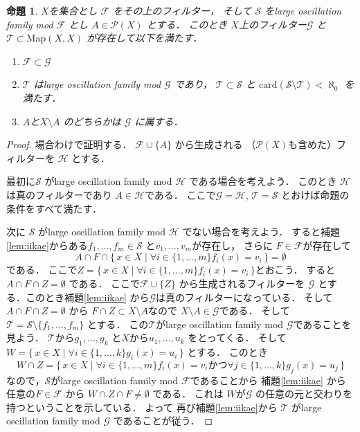 \documentclass[leqno, a4paper, 12pt]{jsarticle}
\newtheorem{prop}[thm]{命題}
\newcommand{\card}{\mathrm{card}}
\newcommand{\myfil}[1]{\mathcal{#1}}
\newcommand{\myfam}[1]{\mathscr{#1}}
\newcommand{\mymap}[2]{\mathrm{Map}(#1, #2)}
\newcommand{\mypowset}[1]{\mathcal{P}(#1)}
\begin{document}
\begin{prop}\label{prop:sagesage}
$X$を集合とし
$\myfil{F}$
をその上のフィルター，
そして
$\myfam{S}$
をlarge oscillation family mod $\myfil{F}$
とし
$A\in \mypowset{X}$
とする．
このとき
$X$上のフィルター$\myfil{G}$
と
$\myfam{T}\subset \mymap{X}{X}$
が存在して以下を満たす．
\begin{enumerate}[label=\textup{(\arabic*)}]
\item 
$\myfil{F}\subset \myfil{G}$
\item 
$\myfam{T}$
はlarge oscillation family mod $\myfam{G}$
であり，
$\myfam{T}\subset \myfam{S}$
と
$\card(\myfam{S}\setminus \myfam{T})<\aleph_{0}$
を満たす．
\item 
$A$と$X\setminus A$
のどちらかは
$\myfil{G}$
に属する．
\end{enumerate}
\end{prop}
\begin{proof}
場合わけで証明する．
$\myfil{F}\cup \{A\}$
から生成される
（$\mypowset{X}$も含めた）フィルターを
$\myfil{H}$
とする．

最初に$\myfam{S}$
がlarge oscillation family mod $\myfil{H}$
である場合を考えよう．
このとき
$\myfil{H}$は真のフィルターであり
$A\in \myfil{H}$である．
ここで$\myfil{G}=\myfil{H}$, 
$\myfam{T}=\myfam{S}$
とおけば命題の条件をすべて満たす．

次に
$\myfam{S}$
がlarge oscillation family mod $\myfil{H}$
でない場合を考えよう．
すると補題\ref{lem:iikae}からある$f_{1}, \dots, f_{m}\in \myfam{S}$
と$v_{1}, \dots, v_{m}$が存在し，
さらに
$F\in \myfil{F}$が存在して
\[
A\cap F\cap \{\, x\in X\mid \forall i\in \{1, \dots, m\} f_{i}(x)=v_{i}\, \}=\emptyset
\]
である．
ここで$Z=\{\, x\in X\mid \forall i\in \{1, \dots, m\} f_{i}(x)=v_{i}\, \}$とおこう．
すると$A\cap F\cap Z=\emptyset$
である．
ここで$\myfil{F}\cup \{Z\}$
から生成されるフィルターを
$\myfil{G}$
とする．このとき補題\ref{lem:iikae}
から$\myfil{G}$は真のフィルターになっている．
そして$A\cap F\cap Z=\emptyset$
から
$F\cap Z\subset X\setminus A$なので
$X\setminus A\in \myfil{G}$である．
そして
$\myfam{T}=\myfam{S}\setminus\{f_{1}, \dots, f_{m}\}$
とする．
この$\myfam{T}$がlarge oscillation family mod
$\myfil{G}$であることを見よう．
$\myfam{T}$から$g_{1}, \dots, g_{k}$
と$X$から$u_{1}, \dots, u_{k}$
をとってくる．
そして
$W=\{\, x\in X\mid \forall i\in \{1, \dots, k\} g_{i}(x)=u_{i}\, \}$
とする．
このとき
\[
W\cap Z=\{\, x\in X\mid \forall i\in \{1, \dots, m\}f_{i}(x)=v_{i}\text{かつ}\forall j\in \{1, \dots, k\} g_{j}(x)=u_{j}\, \}
\]
なので，$\myfam{S}$がlarge oscillation family mod 
$\myfil{F}$であることから
補題\ref{lem:iikae}
から
任意の$F\in \myfil{F}$
から
$W\cap Z\cap F\neq \emptyset$
である．
これは
$W$が$\myfil{G}$
の任意の元と交わりを持つということを示している．
よって
再び補題\ref{lem:iikae}から
$\myfam{T}$
がlarge oscillation family 
mod $\myfil{G}$
であることが従う．
\end{proof}
\end{document}
